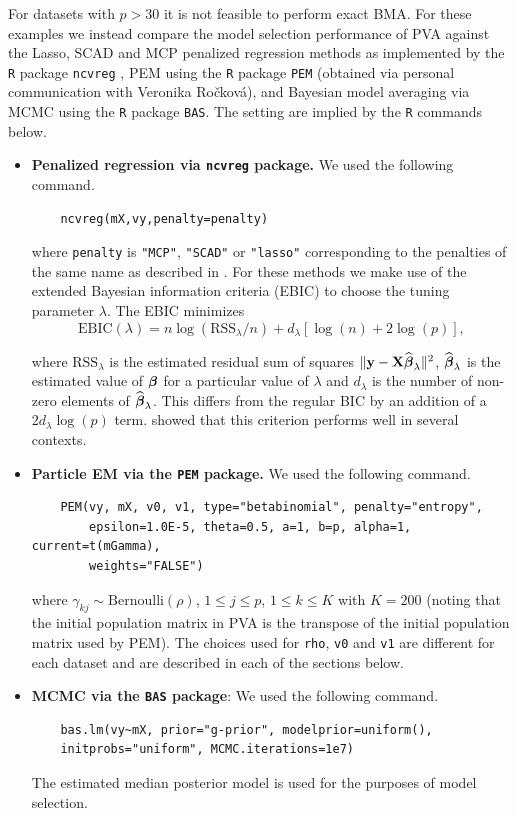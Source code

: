 For datasets with $p>30$ it is not feasible to perform exact BMA.
For these examples
we instead compare the model selection performance of PVA against the Lasso, SCAD
and MCP penalized regression methods as implemented by the {\tt R} package
{\tt ncvreg} \citep{Breheny2011}, PEM using the {\tt R} package {\tt PEM} (obtained 
via personal communication with Veronika Ro\v{c}kov\'a), and Bayesian model averaging via MCMC using
the {\tt R} package {\tt BAS}. 
The
setting are implied by the {\tt R} commands below.
\begin{itemize}
	
	
	\item {\bf Penalized regression via {\tt ncvreg} package.} We used the following command.
	\begin{verbatim}
	ncvreg(mX,vy,penalty=penalty)
	\end{verbatim}
	
	\noindent where {\tt penalty} is {\tt "MCP"}, {\tt "SCAD"} or {\tt "lasso"} corresponding to the penalties
	of the same name as described in \cite{Breheny2011}.
	For these methods we make use of the extended
	Bayesian information criteria (EBIC) \citep{Chen2008} to choose the tuning parameter $\lambda$. The EBIC 
	minimizes
	$$
	\mbox{EBIC}(\lambda) = n\log(\mbox{RSS}_\lambda/n) + d_\lambda
	\left[ \log(n) + 2\log(p) \right],
	$$
	
	\noindent where $\mbox{RSS}_\lambda$ is the estimated residual sum of squares
	$\|{\bf y} - {\bf X}\widehat{{\boldsymbol \beta}}_\lambda\|^2$, $\widehat{{\boldsymbol \beta}}_\lambda$ is the
	estimated value of ${\boldsymbol \beta}$ for a particular value of $\lambda$ and 
	$d_\lambda$ is the number of non-zero elements of $\widehat{{\boldsymbol \beta}}_\lambda$.
	This differs from the regular BIC by an addition of a $2 d_\lambda \log(p)$ term. 
	\cite{Wang2007} showed that this criterion performs well in several contexts.
	
	\item {\bf Particle EM via the {\tt PEM} package.} We used the following command.
	\begin{verbatim}
	PEM(vy, mX, v0, v1, type="betabinomial", penalty="entropy",
	    epsilon=1.0E-5, theta=0.5, a=1, b=p, alpha=1, current=t(mGamma), 
	    weights="FALSE")
	\end{verbatim}
	
	\noindent where $\gamma_{kj} \sim \mbox{Bernoulli}(\rho)$, $1\le j\le p$,
	$1\le k\le K$ with $K=200$ (noting that the initial population matrix in PVA is the transpose of the 
	initial population matrix used by PEM). The choices used for {\tt rho}, {\tt v0} and {\tt v1}
	are different for each dataset and are described in each of the sections below.
	
	
	\item {\bf MCMC via the {\tt BAS} package}: We used the following command.
	\begin{verbatim}
	bas.lm(vy~mX, prior="g-prior", modelprior=uniform(), 
    initprobs="uniform", MCMC.iterations=1e7)
	\end{verbatim}
	
	The estimated median posterior model is used for the purposes of model selection.
	
\end{itemize}

